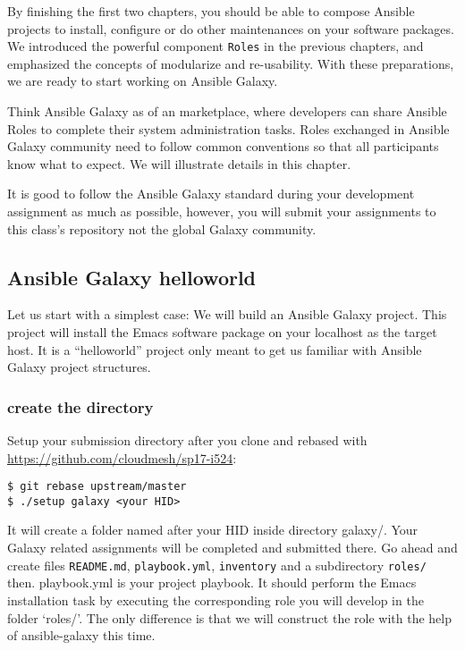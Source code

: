 By finishing the first two chapters, you should be able to compose
Ansible projects to install, configure or do other maintenances on your
software packages. We introduced the powerful component \texttt{Roles}
in the previous chapters, and emphasized the concepts of modularize and
re-usability. With these preparations, we are ready to start working on
Ansible Galaxy.

Think Ansible Galaxy as of an marketplace, where developers can share
Ansible Roles to complete their system administration tasks. Roles
exchanged in Ansible Galaxy community need to follow common conventions
so that all participants know what to expect. We will illustrate details
in this chapter.

It is good to follow the Ansible Galaxy standard during your development
assignment as much as possible, however, you will submit your
assignments to this class's repository not the global Galaxy community.

\subsection{Ansible Galaxy helloworld}\label{ansible-galaxy-helloworld}

Let us start with a simplest case: We will build an Ansible Galaxy
project. This project will install the Emacs software package on your
localhost as the target host. It is a ``helloworld'' project only meant
to get us familiar with Ansible Galaxy project structures.

\subsubsection{create the directory}\label{create-the-directory}

Setup your submission directory after you clone and rebased with
\url{https://github.com/cloudmesh/sp17-i524}:

\begin{verbatim}
$ git rebase upstream/master
$ ./setup galaxy <your HID>
\end{verbatim}

It will create a folder named after your HID inside directory galaxy/.
Your Galaxy related assignments will be completed and submitted there.
Go ahead and create files \texttt{README.md}, \texttt{playbook.yml},
\texttt{inventory} and a subdirectory \texttt{roles/} then. playbook.yml
is your project playbook. It should perform the Emacs installation task
by executing the corresponding role you will develop in the folder
`roles/'. The only difference is that we will construct the role with
the help of ansible-galaxy this time.

